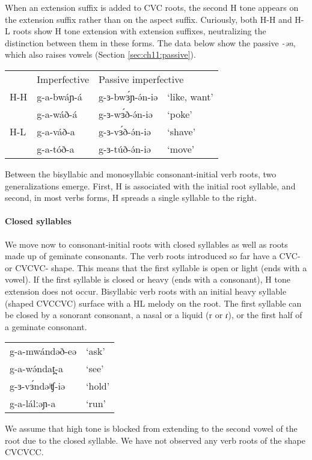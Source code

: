 When an extension suffix is added to CVC roots, the second H tone appears on the extension suffix rather than on the aspect suffix. Curiously, both H-H and H-L roots show H tone extension with extension suffixes, neutralizing the distinction between them in these forms. The data below show the passive \textit{-ən}, which also raises vowels (Section \ref{sec:ch11:passive}).
\ea 
\begin{tabular}[t]{llll}
&	Imperfective	&	\multicolumn{2}{l}{Passive imperfective} 	\\
H-H &	g-a-bwáɲ-á	&	g-ɜ-bwɜ́ɲ-ə́n-iə	&	‘like, want’\\
	&	g-a-wáð-á	&	g-ɜ-wɜ́ð-ə́n-iə	&	‘poke’\\
H-L &	g-a-váð-a	&	g-ɜ-vɜ́ð-ə́n-iə	&	‘shave’\\
	&	g-a-tóð-a	&	g-ɜ-túð-ə́n-iə	&	‘move’\\
\end{tabular}	
\z 

Between the bisyllabic and monosyllabic consonant-initial verb roots, two generalizations emerge. First, H is associated with the initial root syllable, and second, in most verbs forms, H spreads a single syllable to the right. 
			
\paragraph{Closed syllables} We move now to consonant-initial roots with closed syllables as well as roots made up of geminate consonants. The verb roots introduced so far have a CVC- or CVCVC- shape. This means that the first syllable is open or light (ends with a vowel). If the first syllable is closed or heavy (ends with a consonant), H tone extension does not occur. Bisyllabic verb roots with an initial heavy syllable (shaped CVCCVC) surface with a HL melody on the root. The first syllable can be closed by a sonorant consonant, a nasal or a liquid (r or ɾ), or the first half of a geminate consonant. 
\ea 	
\begin{tabular}[t]{ll}
g-a-mwándəð-eə	&	‘ask’\\
g-a-wə́ndat̪-a		&	‘see’\\
g-ɜ-vɜ́ndəʲʧ-iə	&	‘hold’\\
g-a-lálːəɲ-a	&	‘run’ \\	
\end{tabular}
\z 
We assume that high tone is blocked from extending to the second vowel of the root due to the closed syllable. We have not observed any verb roots of the shape CVCVCC. 

